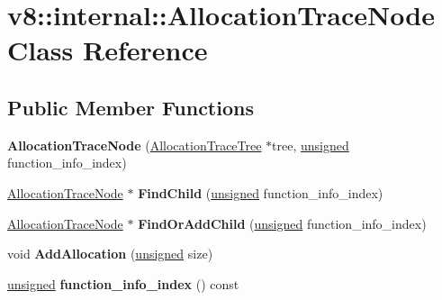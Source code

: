 \hypertarget{classv8_1_1internal_1_1AllocationTraceNode}{}\section{v8\+:\+:internal\+:\+:Allocation\+Trace\+Node Class Reference}
\label{classv8_1_1internal_1_1AllocationTraceNode}
\subsection*{Public Member Functions}
\begin{DoxyCompactItemize}
\item 
\mbox{\label{classv8_1_1internal_1_1AllocationTraceNode_aca8caa93d6a5309e2fc2529b71a5a70a}} 
{\bfseries Allocation\+Trace\+Node} (\mbox{\hyperlink{classv8_1_1internal_1_1AllocationTraceTree}{Allocation\+Trace\+Tree}} $\ast$tree, \mbox{\hyperlink{classunsigned}{unsigned}} function\+\_\+info\+\_\+index)
\item 
\mbox{\label{classv8_1_1internal_1_1AllocationTraceNode_afbb942277677c19a257ff8781f034c1d}} 
\mbox{\hyperlink{classv8_1_1internal_1_1AllocationTraceNode}{Allocation\+Trace\+Node}} $\ast$ {\bfseries Find\+Child} (\mbox{\hyperlink{classunsigned}{unsigned}} function\+\_\+info\+\_\+index)
\item 
\mbox{\label{classv8_1_1internal_1_1AllocationTraceNode_a780262d490b639c1782e3a7212297709}} 
\mbox{\hyperlink{classv8_1_1internal_1_1AllocationTraceNode}{Allocation\+Trace\+Node}} $\ast$ {\bfseries Find\+Or\+Add\+Child} (\mbox{\hyperlink{classunsigned}{unsigned}} function\+\_\+info\+\_\+index)
\item 
\mbox{\label{classv8_1_1internal_1_1AllocationTraceNode_ab3952f0610968cabfdb6a6134395f4a8}} 
void {\bfseries Add\+Allocation} (\mbox{\hyperlink{classunsigned}{unsigned}} size)
\item 
\mbox{\label{classv8_1_1internal_1_1AllocationTraceNode_ae7d97ae5462f51e29627cd0b122951f1}} 
\mbox{\hyperlink{classunsigned}{unsigned}} {\bfseries function\+\_\+info\+\_\+index} () const

\end{DoxyCompactItemize}

